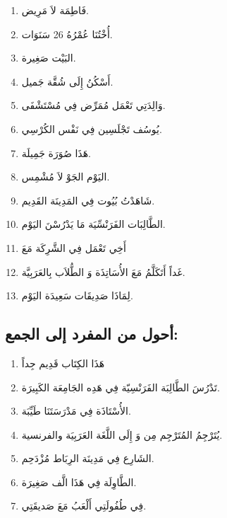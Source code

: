 \documentclass[a4paper]{article}
\begin{document}
\begin{enumerate}
\item فَاطِمَة لاَ مَرِيض.
\item أُخْتُنَا عُمْرُهُ 26 سَنَوَات.
\item البَيْت صَغِيرة.
\item أَسْكُنُ إِلَى شُقَّة جَميل.
\item وَالِدَتِي تَعْمَل مُمَرِّض فِي مُسْتَشْفَى.
\item يُوسُف تَجْلَسِين فِي نَفْس الكُرْسِي.
\item هَذَا صُوَرَة جَمِيلَة.
\item اليَوْم الجَوْ لاَ مُشْمِس.
\item شَاهَدْتُ بُيُوت فِي المَدِينَة القَدِيم.
\item الطَّالِبَات الفَرَنْسِّيَة مَا يَدْرُسْنَ اليَوْم.
\item أَخِي تَعْمَل فِي الشَّرِكَة مَعَ
\item غَداً أَتَكَلَّمُ مَعَ الأُسَاتِذَة وَ الطُّلاَب بِالعَرَبِيَّة.
\item لِمَاذَا صَدِيقَات سَعِيدَة اليَوْم.
\end{enumerate}

\subsection{أحول من المفرد إلى الجمع:}
\begin{enumerate}
\item هَذَا الكِتَاب قَدِيم جِداً
\item تَدْرُسَ الطَّالِبَة الفَرَنْسِيّة فِي هَدِه الجَامِعَة الكَبِيرَة.
\item الأُسْتَاذَة فِي مَدْرَسَتَنَا طَيِّبَة.
\item يُتَرْجِمُ المُتَرْجِم مِن وَ إِلَى اللَّغَة العَرَبِيَة والفرنسية.
\item الشَارِع فِي مَدِينَة الرِبَاط مُزْدَحِم.
\item الطَّاوِلَة فِي هَذَا الَّف صَغِيرَة.
\item فِي طُفُولَتِي أَلْعَبُ مَعَ صَديقَتِي.
\end{enumerate}
\end{document}
